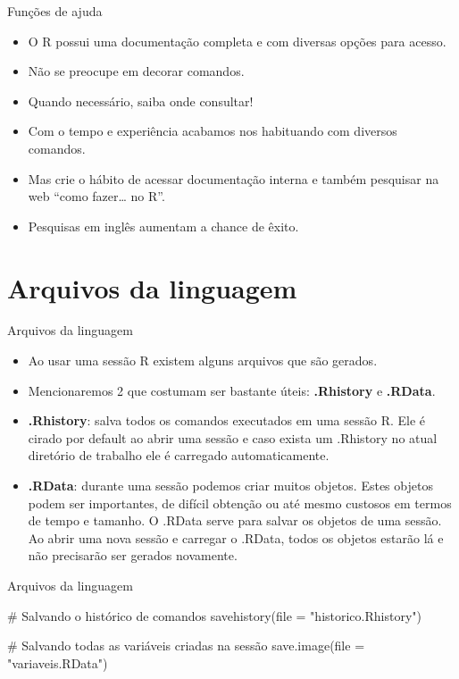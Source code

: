 \documentclass[
  ignorenonframetext,
  serif,
  professionalfont,
  usenames,
  dvipsnames,
  aspectratio = 169]{beamer}
\newenvironment{Shaded}{}{}
\newcommand{\AttributeTok}[1]{#1}
\newcommand{\CommentTok}[1]{\textcolor[rgb]{0.00,0.50,0.00}{#1}}
\newcommand{\FunctionTok}[1]{#1}
\newcommand{\NormalTok}[1]{#1}
\newcommand{\StringTok}[1]{\textcolor[rgb]{0.00,0.50,0.50}{#1}}
\renewenvironment{Shaded}{
    \vspace{2pt}
    \begin{tcolorbox}[
      boxrule=0pt,      %
      colframe=gray!10, %
      colback=gray!10,  %
      arc=1em,          %
      sharp corners,
      boxsep=0.5em,     %
      left=3pt, right=3pt, top=3pt, bottom=3pt, %
      grow to left by=0mm,
      grow to right by=6pt,
      ]
    }{
    \end{tcolorbox}
    \vspace{-3pt}
    }
\begin{document}
\begin{frame}{Funções de ajuda}
\protect\hypertarget{funuxe7uxf5es-de-ajuda-5}{}
\begin{itemize}
\item
  O R possui uma documentação completa e com diversas opções para
  acesso.
\item
  Não se preocupe em decorar comandos.
\item
  Quando necessário, saiba onde consultar!
\item
  Com o tempo e experiência acabamos nos habituando com diversos
  comandos.
\item
  Mas crie o hábito de acessar documentação interna e também pesquisar
  na web ``como fazer\ldots{} no R''.
\item
  Pesquisas em inglês aumentam a chance de êxito.
\end{itemize}
\end{frame}

\hypertarget{arquivos-da-linguagem}{%
\section{Arquivos da linguagem}\label{arquivos-da-linguagem}}

\begin{frame}{Arquivos da linguagem}
\protect\hypertarget{arquivos-da-linguagem-1}{}
\begin{itemize}
\item
  Ao usar uma sessão R existem alguns arquivos que são gerados.
\item
  Mencionaremos 2 que costumam ser bastante úteis: \textbf{.Rhistory} e
  \textbf{.RData}.
\item
  \textbf{.Rhistory}: salva todos os comandos executados em uma sessão
  R. Ele é cirado por default ao abrir uma sessão e caso exista um
  .Rhistory no atual diretório de trabalho ele é carregado
  automaticamente.
\item
  \textbf{.RData}: durante uma sessão podemos criar muitos objetos.
  Estes objetos podem ser importantes, de difícil obtenção ou até mesmo
  custosos em termos de tempo e tamanho. O .RData serve para salvar os
  objetos de uma sessão. Ao abrir uma nova sessão e carregar o .RData,
  todos os objetos estarão lá e não precisarão ser gerados novamente.
\end{itemize}
\end{frame}

\begin{frame}[fragile]{Arquivos da linguagem}
\protect\hypertarget{arquivos-da-linguagem-2}{}
\begin{Shaded}
\begin{Highlighting}[]
\CommentTok{\# Salvando o histórico de comandos}
\FunctionTok{savehistory}\NormalTok{(}\AttributeTok{file =} \StringTok{"historico.Rhistory"}\NormalTok{)}

\CommentTok{\# Salvando todas as variáveis criadas na sessão}
\FunctionTok{save.image}\NormalTok{(}\AttributeTok{file =} \StringTok{"variaveis.RData"}\NormalTok{)}
\end{Highlighting}
\end{Shaded}
\end{frame}
\end{document}
